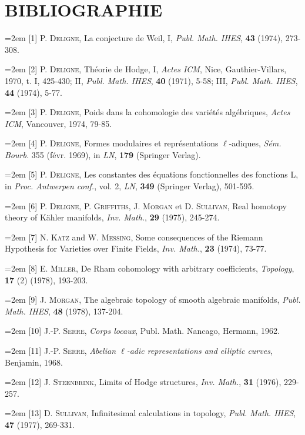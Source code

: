 \documentclass[11pt,leqno]{article}
\begin{document}
\section*{BIBLIOGRAPHIE}

{\small
\noindent\hangindent=2em
[1] P. \textsc{Deligne}, La conjecture de Weil, I, \textit{Publ. Math. IHES}, \textbf{43} (1974), 273-308.

\noindent\hangindent=2em
[2] P. \textsc{Deligne}, Théorie de Hodge, I, \textit{Actes ICM}, Nice, Gauthier-Villars, 1970, t. I, 425-430; II, \textit{Publ. Math. IHES}, \textbf{40} (1971), 5-58; III, \textit{Publ. Math. IHES}, \textbf{44} (1974), 5-77.

\noindent\hangindent=2em
[3] P. \textsc{Deligne}, Poids dans la cohomologie des variétés algébriques, \textit{Actes ICM}, Vancouver, 1974, 79-85.

\noindent\hangindent=2em
[4] P. \textsc{Deligne}, Formes modulaires et représentations \(\ell\)-adiques, \textit{Sém. Bourb.} 355 (févr. 1969), in \textit{LN}, \textbf{179} (Springer Verlag).

\noindent\hangindent=2em
[5] P. \textsc{Deligne}, Les constantes des équations fonctionnelles des fonctions L, in \textit{Proc. Antwerpen conf.}, vol. 2, \textit{LN}, \textbf{349} (Springer Verlag), 501-595.

\noindent\hangindent=2em
[6] P. \textsc{Deligne}, P. \textsc{Griffiths}, J. \textsc{Morgan} et D. \textsc{Sullivan}, Real homotopy theory of Kähler manifolds, \textit{Inv. Math.}, \textbf{29} (1975), 245-274.

\noindent\hangindent=2em
[7] N. \textsc{Katz} and W. \textsc{Messing}, Some consequences of the Riemann Hypothesis for Varieties over Finite Fields, \textit{Inv. Math.}, \textbf{23} (1974), 73-77.

\noindent\hangindent=2em
[8] E. \textsc{Miller}, De Rham cohomology with arbitrary coefficients, \textit{Topology}, \textbf{17} (2) (1978), 193-203.

\noindent\hangindent=2em
[9] J. \textsc{Morgan}, The algebraic topology of smooth algebraic manifolds, \textit{Publ. Math. IHES}, \textbf{48} (1978), 137-204.

\noindent\hangindent=2em
[10] J.-P. \textsc{Serre}, \textit{Corps locaux}, Publ. Math. Nancago, Hermann, 1962.

\noindent\hangindent=2em
[11] J.-P. \textsc{Serre}, \textit{Abelian \(\ell\)-adic representations and elliptic curves}, Benjamin, 1968.

\noindent\hangindent=2em
[12] J. \textsc{Steenbrink}, Limits of Hodge structures, \textit{Inv. Math.}, \textbf{31} (1976), 229-257.

\noindent\hangindent=2em
[13] D. \textsc{Sullivan}, Infinitesimal calculations in topology, \textit{Publ. Math. IHES}, \textbf{47} (1977), 269-331.
\par}
\end{document}
